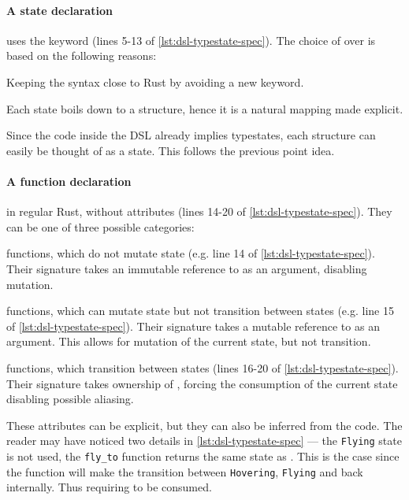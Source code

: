 \paragraph{A state declaration} uses the  keyword (lines 5-13 of \autoref{lst:dsl-typestate-spec}).
The choice of  over  is based on the following reasons:
\begin{compactitem}
    \item Keeping the syntax close to Rust by avoiding a new keyword.
    \item Each state boils down to a structure, hence it is a natural mapping made explicit.
    \item Since the code inside the DSL already implies typestates, each structure can easily be thought of as a state.
    This follows the previous point idea.
\end{compactitem}

\paragraph{A function declaration} in regular Rust, without attributes (lines 14-20 of \autoref{lst:dsl-typestate-spec}).
They can be one of three possible categories:
\begin{compactitem}
    \item {} functions, which do not mutate state (e.g. line 14 of \autoref{lst:dsl-typestate-spec}).
    Their signature takes an immutable reference to  as an argument,
    disabling mutation.
    \item {} functions, which can mutate state but not transition between states (e.g. line 15 of \autoref{lst:dsl-typestate-spec}).
    Their signature takes a mutable reference to  as an argument.
    This allows for mutation of the current state, but not transition.
    \item {} functions, which transition between states (lines 16-20 of \autoref{lst:dsl-typestate-spec}).
    Their signature takes ownership of ,
    forcing the consumption of the current state disabling possible aliasing.
\end{compactitem}
These attributes can be explicit, but they can also be inferred from the code.
The reader may have noticed two details in \autoref{lst:dsl-typestate-spec} ---
the \texttt{Flying} state is not used,
the \texttt{fly\_to} function returns the same state as .
This is the case since the function will make the transition between \texttt{Hovering}, \texttt{Flying} and back internally.
Thus requiring  to be consumed.



